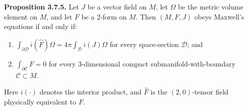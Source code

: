 \textbf{Proposition 3.7.5.} Let $J$ be a vector field on $M$, let $\Omega$ be the metric volume element on $M$, and let $F$ be a 2-form on $M$. Then $(M, F, J)$ obeys Maxwell's equations if and only if:

\begin{enumerate}
\item[(a)] $\displaystyle \int_{\partial \mathcal{D}} i(\hat{F})\Omega = 4\pi \int_{\mathcal{D}} i(J)\Omega$ for every space-section $\mathcal{D}$; and
\item[(b)] $\displaystyle \int_{\partial \mathcal{C}} F = 0$ for every 3-dimensional compact submanifold-with-boundary $\mathcal{C} \subset M$.
\end{enumerate}

Here $i(\cdot)$ denotes the interior product, and $\hat{F}$ is the $(2,0)$-tensor field physically equivalent to $F$.
